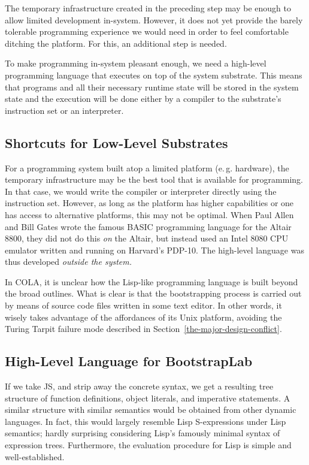 \documentclass[ twoside,openright,titlepage,numbers=noenddot,headinclude,footinclude,cleardoublepage=empty,abstract=on,
                BCOR=5mm,paper=a4,fontsize=11pt
                ]{scrreprt}
\newcommand{\eg}{e.\,g.}
\theoremstyle{definition}
\begin{document}
The temporary infrastructure created in the preceding step may be enough
to allow limited development in-system. However, it does not yet provide
the barely tolerable programming experience we would need in order to
feel comfortable ditching the platform. For this, an additional step is
needed.

To make programming in-system pleasant enough, we need a high-level
programming language that executes on top of the system substrate. This
means that programs and all their necessary runtime state will be stored
in the system state and the execution will be done either by a compiler
to the substrate's instruction set or an interpreter.

\hypertarget{shortcuts-for-low-level-substrates}{\subsection{Shortcuts for Low-Level
Substrates}\label{shortcuts-for-low-level-substrates}}

For a programming system built atop a limited platform (\eg{} hardware),
the temporary infrastructure may be the best tool that is available for
programming. In that case, we would write the compiler or interpreter
directly using the instruction set. However, as long as the platform has
higher capabilities or one has access to alternative platforms, this may
not be optimal. When Paul Allen and Bill Gates wrote the famous BASIC
programming language for the Altair 8800, they did not do this \emph{on}
the Altair, but instead used an Intel 8080 CPU emulator written and
running on Harvard's PDP-10. The high-level language was thus developed
\emph{outside the system.}

In \ac{COLA}, it is unclear how the Lisp-like programming language is
built beyond the broad outlines. What is clear is that the bootstrapping
process is carried out by means of source code files written in some
text editor. In other words, it wisely takes advantage of the
affordances of its Unix platform, avoiding the Turing Tarpit failure
mode described in Section~\ref{the-major-design-conflict}.

\hypertarget{high-level-language-for-bootstraplab}{\subsection{High-Level Language for
BootstrapLab}\label{high-level-language-for-bootstraplab}}

If we take \ac{JS}, and strip away the concrete syntax, we get a
resulting tree structure of function definitions, object literals, and
imperative statements. A similar structure with similar semantics would
be obtained from other dynamic languages. In fact, this would largely
resemble Lisp S-expressions under Lisp semantics; hardly surprising
considering Lisp's famously minimal syntax of expression trees.
Furthermore, the evaluation procedure for Lisp is simple and
well-established.
\end{document}

